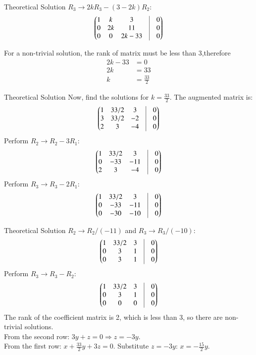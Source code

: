 \documentclass{beamer}
\begin{document}
\begin{frame}{Theoretical Solution}
$R_3 \rightarrow 2k R_3 - (3-2k) R_2$:
\begin{align}
\myvec{
1 & k & 3 & \vrule & 0 \\
0 & 2k & 11 & \vrule & 0 \\
0 & 0 & 2k - 33 & \vrule & 0
}
\end{align}

For a non-trivial solution, the rank of matrix must be less than 3,therefore
\begin{align}
2k - 33 &= 0 \\
2k &= 33 \\
k &= \frac{33}{2}
\end{align}
\end{frame}

\begin{frame}{Theoretical Solution}
Now, find the solutions for $k = \frac{33}{2}$. The augmented matrix is:
\begin{align}
\myvec{
1 & 33/2 & 3 & \vrule & 0 \\
3 & 33/2 & -2 & \vrule & 0 \\
2 & 3 & -4 & \vrule & 0
}
\end{align}
Perform $R_2 \rightarrow R_2 - 3R_1$:
\begin{align}
\myvec{
1 & 33/2 & 3 & \vrule & 0 \\
0 & -33 & -11 & \vrule & 0 \\
2 & 3 & -4 & \vrule & 0
}
\end{align}
Perform $R_3 \rightarrow R_3 - 2R_1$:
\begin{align}
\myvec{
1 & 33/2 & 3 & \vrule & 0 \\
0 & -33 & -11 & \vrule & 0 \\
0 & -30 & -10 & \vrule & 0
}
\end{align}
\end{frame}

\begin{frame}{Theoretical Solution}
$R_2 \rightarrow R_2 / (-11)$ and $R_3 \rightarrow R_3 / (-10)$:
\begin{align}
\myvec{
1 & 33/2 & 3 & \vrule & 0 \\
0 & 3 & 1 & \vrule & 0 \\
0 & 3 & 1 & \vrule & 0
}
\end{align}
Perform $R_3 \rightarrow R_3 - R_2$:
\begin{align}
\myvec{
1 & 33/2 & 3 & \vrule & 0 \\
0 & 3 & 1 & \vrule & 0 \\
0 & 0 & 0 & \vrule & 0
}
\end{align}
The rank of the coefficient matrix is 2, which is less than 3, so there are non-trivial solutions.\\
From the second row: $3y + z = 0 \Rightarrow z = -3y$.\\
From the first row: $x + \frac{33}{2}y + 3z = 0$.
Substitute $z = -3y$:
$x = -\frac{15}{2}y$.
\end{frame}
\end{document}
